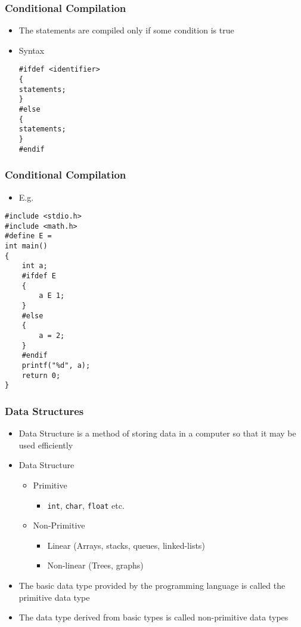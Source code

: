\documentclass[11pt]{beamer}
\begin{document}
\begin{frame}[fragile]\frametitle{Conditional Compilation}
\label{sec-1-22}

\begin{itemize}
\item The statements are compiled only if some condition is true
\item Syntax

\begin{verbatim}
#ifdef <identifier>
{
statements;
}
#else
{
statements;
}
#endif
\end{verbatim}
\end{itemize}
\end{frame}
\begin{frame}[fragile]\frametitle{Conditional Compilation}
\label{sec-1-23}

\begin{itemize}
\item E.g.
\end{itemize}
{\scriptsize 

\begin{verbatim}
#include <stdio.h>
#include <math.h>
#define E =
int main()
{
    int a;
    #ifdef E
    {
        a E 1;
    }
    #else
    {
        a = 2;
    }
    #endif
    printf("%d", a);
    return 0;
}
\end{verbatim}
}
\end{frame}
\begin{frame}[fragile]\frametitle{Data Structures}
\label{sec-1-24}

\begin{itemize}
\item Data Structure is a method of storing data in a computer so that it may be used efficiently
\item Data Structure
\begin{itemize}
\item Primitive
\begin{itemize}
\item \verb~int~, \verb~char~, \verb~float~ etc.
\end{itemize}
\item Non-Primitive
\begin{itemize}
\item Linear (Arrays, stacks, queues, linked-lists)
\item Non-linear (Trees, graphs)
\end{itemize}
\end{itemize}
\end{itemize}
\begin{itemize}
\item The basic data type provided by the programming language is called the primitive data type
\item The data type derived from basic types is called non-primitive data types
\end{itemize}
\end{frame}
\end{document}
